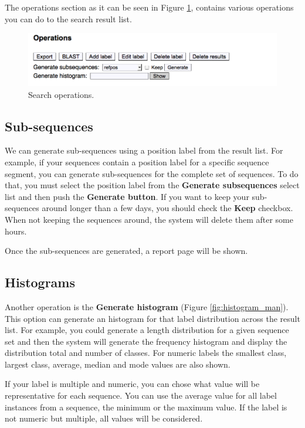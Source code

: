The operations section as it can be seen in Figure \ref{fig:search2_man}, contains various operations
you can do to the search result list.

\begin{figure}[H]
  \centering
    \includegraphics[scale=0.5]{search2.png}
  \caption{Search operations.}
  \label{fig:search2_man}
\end{figure}

\subsection{Sub-sequences}

We can generate sub-sequences using a position label from the result list. For example,
if your sequences contain a position label for a specific sequence segment, you can generate
sub-sequences for the complete set of sequences. To do that, you must select the position label
from the \textbf{Generate subsequences} select list and then push the \textbf{Generate button}.
If you want to keep your sub-sequences around longer than a few days, you should check the \textbf{Keep}
checkbox. When not keeping the sequences around, the system will delete them after some hours.

Once the sub-sequences are generated, a report page will be shown.

\subsection{Histograms}

Another operation is the \textbf{Generate histogram} (Figure \ref{fig:histogram_man}).
This option can generate an histogram
for that label distribution across the result list. For example, you could generate a length
distribution for a given sequence set and then the system will generate the frequency histogram
and display the distribution total and number of classes.
For numeric labels the smallest class, largest class, average, median and mode values are also shown.

If your label is multiple and numeric, you can chose what value will be representative for each sequence.
You can use the average value for all label instances from a sequence, the minimum or the maximum value.
If the label is not numeric but multiple, all values will be considered.

